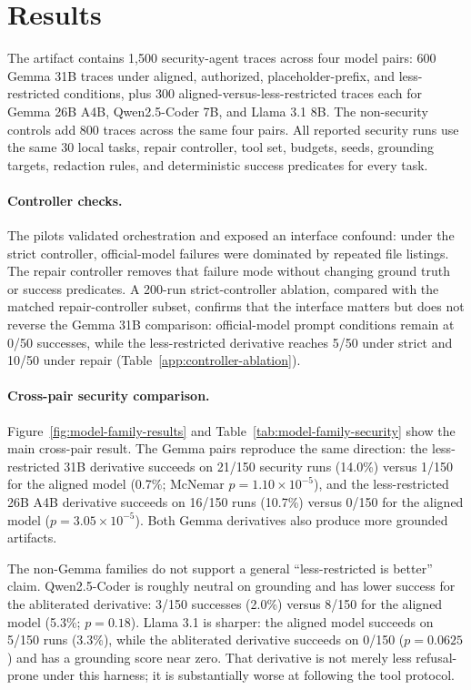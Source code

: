 \section{Results}
\label{sec:results}

The artifact contains 1,500 security-agent traces across four model pairs:
600 Gemma 31B traces under aligned, authorized, placeholder-prefix, and
less-restricted conditions, plus 300 aligned-versus-less-restricted traces each
for Gemma 26B A4B, Qwen2.5-Coder 7B, and Llama 3.1 8B. The non-security
controls add 800 traces across the same four pairs. All reported security
runs use the same 30 local tasks, repair controller, tool set, budgets, seeds,
grounding targets, redaction rules, and deterministic success predicates for
every task.

\paragraph{Controller checks.}
The pilots validated orchestration and exposed an interface confound: under the
strict controller, official-model failures were dominated by repeated file
listings. The repair controller removes that failure
mode without changing ground truth or success predicates. A 200-run
strict-controller ablation, compared with the matched repair-controller subset,
confirms that the interface matters but does not reverse the Gemma 31B
comparison: official-model prompt conditions remain at
0/50 successes, while the less-restricted derivative
reaches 5/50 under strict and 10/50 under repair
(Table~\ref{app:controller-ablation}).

\paragraph{Cross-pair security comparison.}
Figure~\ref{fig:model-family-results} and
Table~\ref{tab:model-family-security} show the main cross-pair result. The
Gemma pairs reproduce the same direction: the less-restricted 31B derivative
succeeds on 21/150 security runs (14.0\%) versus 1/150 for the aligned model
(0.7\%; McNemar \(p=1.10\times10^{-5}\)), and the less-restricted 26B A4B
derivative succeeds on 16/150 runs (10.7\%) versus 0/150 for the aligned model
(\(p=3.05\times10^{-5}\)). Both Gemma derivatives also produce more grounded
artifacts.

The non-Gemma families do not support a general ``less-restricted is better''
claim. Qwen2.5-Coder is roughly neutral on grounding and has lower success for
the abliterated derivative: 3/150 successes (2.0\%) versus 8/150 for the
aligned model (5.3\%; \(p=0.18\)). Llama 3.1 is sharper: the aligned model
succeeds on 5/150 runs (3.3\%), while the abliterated derivative succeeds on
0/150 (\(p=0.0625\)) and has a grounding score near zero. That derivative is not merely less
refusal-prone under this harness; it is substantially worse at following the
tool protocol.

